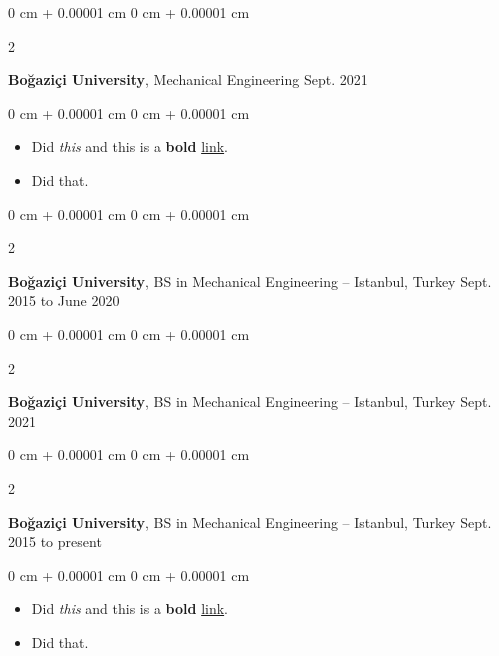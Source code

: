 \documentclass[10pt, letterpaper]{article}
\newenvironment{highlights}{
    \begin{itemize}[
        topsep=0.10 cm,
        parsep=0.10 cm,
        partopsep=0pt,
        itemsep=0pt,
        leftmargin=0 cm + 10pt
    ]
}{
    \end{itemize}
} %
\newenvironment{onecolentry}{
    \begin{adjustwidth}{
        0 cm + 0.00001 cm
    }{
        0 cm + 0.00001 cm
    }
}{
    \end{adjustwidth}
} %
\newenvironment{twocolentry}[2][]{
    \onecolentry
    \def\secondColumn{#2}
    \setcolumnwidth{\fill, 4.5 cm}
    \begin{paracol}{2}
}{
    \switchcolumn \raggedleft \secondColumn
    \end{paracol}
    \endonecolentry
} %
\begin{document}
        \vspace{0.2 cm}

        \begin{twocolentry}{
            Sept. 2021
        }
            \textbf{Boğaziçi University}, Mechanical Engineering\end{twocolentry}

        \vspace{0.10 cm}
        \begin{onecolentry}
            \begin{highlights}
                \item Did \textit{this} and this is a \textbf{bold} \href{https://example.com}{link}.
                \item Did that.
            \end{highlights}
        \end{onecolentry}


        \vspace{0.2 cm}

        \begin{twocolentry}{
            Sept. 2015 to June 2020
        }
            \textbf{Boğaziçi University}, BS in Mechanical Engineering -- Istanbul, Turkey\end{twocolentry}



        \vspace{0.2 cm}

        \begin{twocolentry}{
            Sept. 2021
        }
            \textbf{Boğaziçi University}, BS in Mechanical Engineering -- Istanbul, Turkey\end{twocolentry}



        \vspace{0.2 cm}

        \begin{twocolentry}{
            Sept. 2015 to present
        }
            \textbf{Boğaziçi University}, BS in Mechanical Engineering -- Istanbul, Turkey\end{twocolentry}

        \vspace{0.10 cm}
        \begin{onecolentry}
            \begin{highlights}
                \item Did \textit{this} and this is a \textbf{bold} \href{https://example.com}{link}.
                \item Did that.
            \end{highlights}
        \end{onecolentry}
\end{document}
